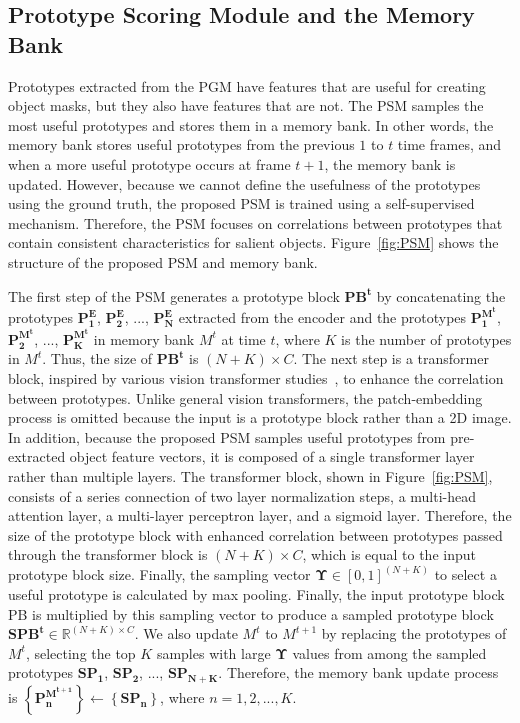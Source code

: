 \documentclass[10pt,twocolumn,letterpaper]{article}
\begin{document}
\subsection{Prototype Scoring Module and the Memory Bank}
Prototypes extracted from the PGM have features that are useful for creating object masks, but they also have features that are not. The PSM samples the most useful prototypes and stores them in a memory bank. In other words, the memory bank stores useful prototypes from the previous $1$ to $t$ time frames, and when a more useful prototype occurs at frame $t+1$, the memory bank is updated. However, because we cannot define the usefulness of the prototypes using the ground truth, the proposed PSM is trained using a self-supervised mechanism. Therefore, the PSM focuses on correlations between prototypes that contain consistent characteristics for salient objects. Figure~\ref{fig:PSM} shows the structure of the proposed PSM and memory bank.

The first step of the PSM generates a prototype block $\mathbf{PB^t}$ by concatenating the prototypes $\mathbf{P^{E}_1}$, $\mathbf{P^{E}_2}$, ..., $\mathbf{P^{E}_N}$ extracted from the encoder and the prototypes $\mathbf{P^{M^t}_1}$, $\mathbf{P^{M^t}_2}$, ..., $\mathbf{P^{M^t}_K}$ in memory bank $M^t$ at time $t$, where $K$ is the number of prototypes in $M^t$. Thus, the size of $\mathbf{PB^t}$ is $\left(N + K \right) \times C$. The next step is a transformer block, inspired by various vision transformer studies~\cite{dosovitskiy2020image, zheng2021rethinking, wang2021end}, to enhance the correlation between prototypes. Unlike general vision transformers, the patch-embedding process is omitted because the input is a prototype block rather than a 2D image. In addition, because the proposed PSM samples useful prototypes from pre-extracted object feature vectors, it is composed of a single transformer layer rather than multiple layers. The transformer block, shown in Figure~\ref{fig:PSM}, consists of a series connection of two layer normalization steps, a multi-head attention layer, a multi-layer perceptron layer, and a sigmoid layer. Therefore, the size of the prototype block with enhanced correlation between prototypes passed through the transformer block is $\left(N + K \right) \times C$, which is equal to the input prototype block size. Finally, the sampling vector $\mathbf{\Upsilon} \in \left[0, 1\right] ^ {\left( N + K \right)}$ to select a useful prototype is calculated by max pooling. Finally, the input prototype block PB is multiplied by this sampling vector to produce a sampled prototype block $\mathbf{SPB^t} \in \mathbb{R} ^ {\left(N + K \right) \times C}$. We also update $M^t$ to $M^{t+1}$ by replacing the prototypes of $M^t$, selecting the top $K$ samples with large $\mathbf{\Upsilon}$ values from among the sampled prototypes $\mathbf{SP_1}$, $\mathbf{SP_2}$, ..., $\mathbf{SP_{N+K}}$. Therefore, the memory bank update process is $\left \{ \mathbf{P _ { n } ^ { M ^ { t+1 } }} \right \} \leftarrow \left \{ \mathbf{SP _ { n }} \right \}$, where $n = 1, 2, ... , K$.
\end{document}
